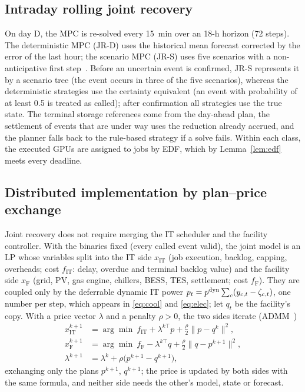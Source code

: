 \subsection{Intraday rolling joint recovery}
\label{sec:mpc}

On day D, the MPC is re-solved every 15~min over an 18-h horizon (72 steps). The deterministic MPC (JR-D) uses the
historical mean forecast corrected by the error of the last hour; the scenario MPC (JR-S) uses five scenarios with a
non-anticipative first step~\cite{schildbach2014}. Before an uncertain event is confirmed, JR-S represents it by a
scenario tree (the event occurs in three of the five scenarios), whereas the deterministic strategies use the certainty
equivalent (an event with probability of at least 0.5 is treated as called); after confirmation all strategies use the
true state. The terminal storage references come from the day-ahead plan, the settlement of events that are under way
uses the reduction already accrued, and the planner falls back to the rule-based strategy if a solve fails. Within each class, the executed GPUs are assigned to jobs by EDF, which by Lemma~\ref{lem:edf} meets every
deadline.

\subsection{Distributed implementation by plan--price exchange}
\label{sec:admm}

Joint recovery does not require merging the IT scheduler and the facility controller. With the binaries fixed (every
called event valid), the joint model is an LP whose variables split into the IT side $x_{\mathrm{IT}}$ (job execution,
backlog, capping, overheads; cost $f_{\mathrm{IT}}$: delay, overdue and terminal backlog value) and the facility side
$x_{\mathrm F}$ (grid, PV, gas engine, chillers, BESS, TES, settlement; cost $f_{\mathrm F}$). They are coupled only by
the deferrable dynamic IT power $p_t=p^{\mathrm{dyn}}\sum_c(y_{c,t}-\zeta_{c,t})$, one number per step, which appears in
\eqref{eq:cool} and \eqref{eq:elec}; let $q_t$ be the facility's copy. With a price vector $\lambda$ and a penalty
$\rho>0$, the two sides iterate (ADMM~\cite{boyd2011})
\begin{equation}
\begin{aligned}
x_{\mathrm{IT}}^{k+1}&=\arg\min\ f_{\mathrm{IT}}+\lambda^{k\top}p+\tfrac{\rho}{2}\|p-q^k\|^2,\\
x_{\mathrm F}^{k+1}&=\arg\min\ f_{\mathrm F}-\lambda^{k\top}q+\tfrac{\rho}{2}\|q-p^{k+1}\|^2,\\
\lambda^{k+1}&=\lambda^k+\rho\big(p^{k+1}-q^{k+1}\big),
\end{aligned}
\label{eq:admm}
\end{equation}
exchanging only the plans $p^{k+1}$, $q^{k+1}$; the price is updated by both sides with the same formula, and neither
side needs the other's model, state or forecast.

